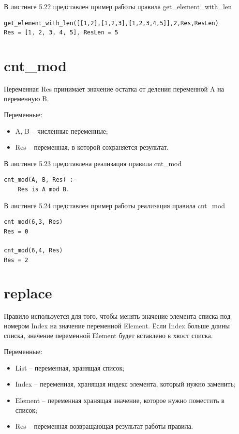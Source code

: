 \documentclass[12pt]{report}
\begin{document}
В листинге 5.22 представлен пример работы правила get\_element\_with\_len

\begin{lstlisting}[label=some-code, caption=пример работы правила get\_element\_with\_len]
get_element_with_len([[1,2],[1,2,3],[1,2,3,4,5]],2,Res,ResLen)
Res = [1, 2, 3, 4, 5], ResLen = 5
\end{lstlisting}

\section{cnt\_mod}
Переменная Res принимает значение остатка от деления переменной A на переменную B.

Переменные:
\begin{itemize}
\item A, B – численные переменные;
\item Res – переменная, в которой сохраняется результат.
\end{itemize}

В листинге 5.23 представлена реализация правила cnt\_mod

\begin{lstlisting}[label=some-code, caption=реализация правила cnt\_mod]
cnt_mod(A, B, Res) :-
	Res is A mod B.
\end{lstlisting}
В листинге 5.24 представлен пример работы реализация правила cnt\_mod

\begin{lstlisting}[label=some-code, caption=пример работы правила cnt\_mod]
cnt_mod(6,3, Res)
Res = 0

cnt_mod(6,4, Res)
Res = 2
\end{lstlisting}

\section{replace}
Правило используется для того, чтобы менять значение элемента списка под номером Index на значение переменной Element. Если Index больше длины списка, значение переменной Element будет вставлено в хвост списка.

Переменные:
\begin{itemize}
\item List – переменная, хранящая список;
\item Index – переменная, хранящая индекс элемента, который нужно заменить;
\item Element – переменная хранящая значение, которое нужно поместить в список;
\item Res – переменная возвращающая результат работы правила.
\end{itemize}
\end{document}
